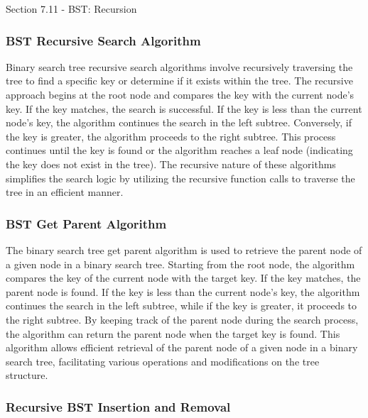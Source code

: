 \begin{notes}{Section 7.11 - BST: Recursion}
    \subsubsection*{BST Recursive Search Algorithm}

    Binary search tree recursive search algorithms involve recursively traversing the tree to find a specific key or determine if it exists within the tree. The recursive approach begins at the root node and compares the key with the current node's key. If the key matches, the search is successful. If the key is less than the current node's key, 
    the algorithm continues the search in the left subtree. Conversely, if the key is greater, the algorithm proceeds to the right subtree. This process continues until the key is found or the algorithm reaches a leaf node (indicating the key does not exist in the tree). The recursive nature of these algorithms simplifies the search logic by utilizing 
    the recursive function calls to traverse the tree in an efficient manner.
    
    \subsubsection*{BST Get Parent Algorithm}
    
    The binary search tree get parent algorithm is used to retrieve the parent node of a given node in a binary search tree. Starting from the root node, the algorithm compares the key of the current node with the target key. If the key matches, the parent node is found. If the key is less than the current node's key, the algorithm continues 
    the search in the left subtree, while if the key is greater, it proceeds to the right subtree. By keeping track of the parent node during the search process, the algorithm can return the parent node when the target key is found. This algorithm allows efficient retrieval of the parent node of a given node in a binary search tree, facilitating 
    various operations and modifications on the tree structure.
    
    \subsubsection*{Recursive BST Insertion and Removal}
    

\end{notes}
